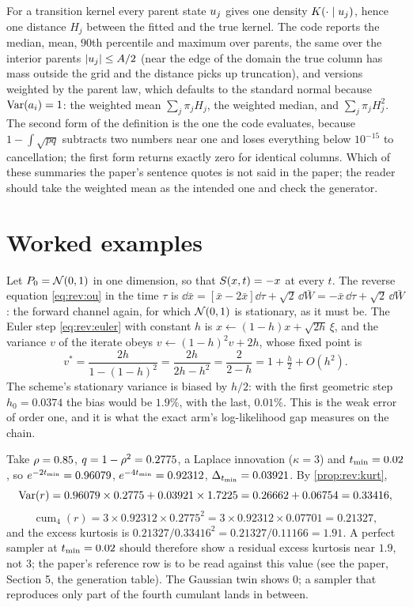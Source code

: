 For a transition kernel every parent state $u_{j}$ gives one density
$K(\cdot\mid u_{j})$, hence one distance $H_j$ between the fitted and the
true kernel. The code reports the median, mean, $90$th percentile and maximum over
parents, the same over the interior parents $|u_{j}|\le A/2$ (near the
edge of the domain the true column has mass outside the grid and the distance picks
up truncation), and versions weighted by the parent law, which defaults to the
standard normal because $\operatorname{Var}(a_i)=1$: the weighted mean $\sum_j\pi_jH_j$, the
weighted median, and $\sum_j\pi_jH_j^2$. The second form of the definition is the
one the code evaluates, because $1-\int\sqrt{pq}$ subtracts two numbers near one and
loses everything below $10^{-15}$ to cancellation; the first form returns exactly zero
for identical columns. Which of these summaries the paper's sentence quotes is not
said in the paper; the reader should take the weighted mean as the intended one and
check the generator.

\section{Worked examples}
\label{sec:rev:examples}

\begin{example}
\label{ex:rev:gaussian}
Let $P_0=\mathcal{N}\!\left(0,1\right)$ in one dimension, so that $S(x,t)=-x$ at every $t$. The reverse
equation \cref{eq:rev:ou} in the time $\tau$ is
$\dd\bar x=[\bar x-2\bar x]\dd\tau+\sqrt2\,\dd\bar W=-\bar x\,\dd\tau+\sqrt2\,\dd\bar W$:
the forward channel again, for which $\mathcal{N}\!\left(0,1\right)$ is stationary, as it must be. The
Euler step \cref{eq:rev:euler} with constant $h$ is $x\leftarrow(1-h)x+\sqrt{2h}\,\xi$,
and the variance $v$ of the iterate obeys $v\leftarrow(1-h)^2v+2h$, whose fixed point is
\[
  v^\ast=\frac{2h}{1-(1-h)^2}=\frac{2h}{2h-h^2}=\frac{2}{2-h}=1+\tfrac h2+O(h^2).
\]
The scheme's stationary variance is biased by $h/2$: with the first geometric step
$h_0=0.0374$ the bias would be $1.9\%$, with the last, $0.01\%$. This is the weak error
of order one, and it is what the exact arm's log-likelihood gap measures on the chain.
\end{example}

\begin{example}
\label{ex:rev:kurt}
Take $\rho=0.85$, $q=1-\rho^2=0.2775$, a Laplace innovation ($\kappa=3$) and
$t_{\min}=0.02$, so $e^{-2t_{\min}}=0.96079$, $e^{-4t_{\min}}=0.92312$, $\Delta_{t_{\min}}=0.03921$.
By \cref{prop:rev:kurt},
\[
  \operatorname{Var}(r)=0.96079\times0.2775+0.03921\times1.7225=0.26662+0.06754=0.33416,
\]
\[
  \operatorname{cum}_4(r)=3\times0.92312\times0.2775^2=3\times0.92312\times0.07701=0.21327,
\]
and the excess kurtosis is $0.21327/0.33416^2=0.21327/0.11166=1.91$. A perfect
sampler at $t_{\min}=0.02$ should therefore show a residual excess kurtosis near $1.9$,
not $3$; the paper's reference row is to be read against this value (see the paper,
Section 5, the generation table). The Gaussian twin shows $0$; a sampler that
reproduces only part of the fourth cumulant lands in between.
\end{example}

